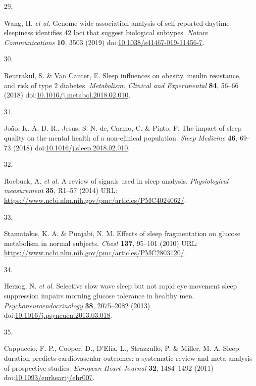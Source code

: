 \documentclass[
  10pt,
]{scrbook}
\newlength{\cslhangindent}
\newlength{\csllabelwidth}
\newlength{\cslentryspacingunit} %
\newenvironment{CSLReferences}[2] %
 {%
  \setlength{\parindent}{0pt}
  \ifodd #1
  \let\oldpar\par
  \def\par{\hangindent=\cslhangindent\oldpar}
  \fi
  \setlength{\parskip}{#2\cslentryspacingunit}
 }%
 {}
\newcommand{\CSLLeftMargin}[1]{\parbox[t]{\csllabelwidth}{#1}}
\newcommand{\CSLRightInline}[1]{\parbox[t]{\linewidth - \csllabelwidth}{#1}\break}
\let\originaltextbf\textbf
\renewcommand{\textbf}[1]{\textcolor{color1}{\textsf{\originaltextbf{#1}}}}
\begin{document}
\begin{CSLReferences}{0}{0}
\leavevmode{}%
\CSLLeftMargin{29. }%
\CSLRightInline{Wang, H. \emph{et al.} Genome-wide association analysis
of self-reported daytime sleepiness identifies 42 loci that suggest
biological subtypes. \emph{Nature Communications} \textbf{10}, 3503
(2019)
doi:\href{https://doi.org/10.1038/s41467-019-11456-7}{10.1038/s41467-019-11456-7}.}

\leavevmode{}%
\CSLLeftMargin{30. }%
\CSLRightInline{Reutrakul, S. \& Van Cauter, E. Sleep influences on
obesity, insulin resistance, and risk of type 2 diabetes.
\emph{Metabolism: Clinical and Experimental} \textbf{84}, 56--66 (2018)
doi:\href{https://doi.org/10.1016/j.metabol.2018.02.010}{10.1016/j.metabol.2018.02.010}.}

\leavevmode{}%
\CSLLeftMargin{31. }%
\CSLRightInline{João, K. A. D. R., Jesus, S. N. de, Carmo, C. \& Pinto,
P. The impact of sleep quality on the mental health of a non-clinical
population. \emph{Sleep Medicine} \textbf{46}, 69--73 (2018)
doi:\href{https://doi.org/10.1016/j.sleep.2018.02.010}{10.1016/j.sleep.2018.02.010}.}

\leavevmode{}%
\CSLLeftMargin{32. }%
\CSLRightInline{Roebuck, A. \emph{et al.} A review of signals used in
sleep analysis. \emph{Physiological measurement} \textbf{35}, R1--57
(2014) URL:
\url{https://www.ncbi.nlm.nih.gov/pmc/articles/PMC4024062/}.}

\leavevmode{}%
\CSLLeftMargin{33. }%
\CSLRightInline{Stamatakis, K. A. \& Punjabi, N. M. Effects of sleep
fragmentation on glucose metabolism in normal subjects. \emph{Chest}
\textbf{137}, 95--101 (2010) URL:
\url{https://www.ncbi.nlm.nih.gov/pmc/articles/PMC2803120/}.}

\leavevmode{}%
\CSLLeftMargin{34. }%
\CSLRightInline{Herzog, N. \emph{et al.} Selective slow wave sleep but
not rapid eye movement sleep suppression impairs morning glucose
tolerance in healthy men. \emph{Psychoneuroendocrinology} \textbf{38},
2075--2082 (2013)
doi:\href{https://doi.org/10.1016/j.psyneuen.2013.03.018}{10.1016/j.psyneuen.2013.03.018}.}

\leavevmode{}%
\CSLLeftMargin{35. }%
\CSLRightInline{Cappuccio, F. P., Cooper, D., D'Elia, L., Strazzullo, P.
\& Miller, M. A. Sleep duration predicts cardiovascular outcomes: a
systematic review and meta-analysis of prospective studies.
\emph{European Heart Journal} \textbf{32}, 1484--1492 (2011)
doi:\href{https://doi.org/10.1093/eurheartj/ehr007}{10.1093/eurheartj/ehr007}.}


\end{CSLReferences}
\end{document}
